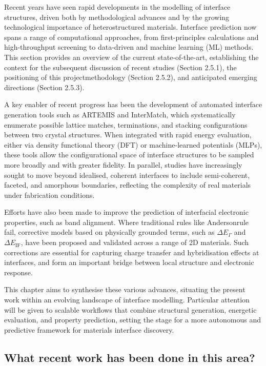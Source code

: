 Recent years have seen rapid developments in the modelling of interface structures, driven both by methodological
advances and by the growing technological importance of heterostructured materials. Interface prediction now spans a
range of computational approaches, from first-principles calculations and high-throughput screening to data-driven and
machine learning (ML) methods. This section provides an overview of the current state-of-the-art, establishing the
context for the subsequent discussion of recent studies (Section 2.5.1), the positioning of this project\rqss methodology
(Section 2.5.2), and anticipated emerging directions (Section 2.5.3).

A key enabler of recent progress has been the development of automated interface generation tools such as ARTEMIS and
InterMatch, which systematically enumerate possible lattice matches, terminations, and stacking configurations between
two crystal structures. When integrated with rapid energy evaluation, either via density functional theory (DFT) or
machine-learned potentials (MLPs), these tools allow the configurational space of interface structures to be sampled
more broadly and with greater fidelity. In parallel, studies have increasingly sought to move beyond idealised,
coherent interfaces to include semi-coherent, faceted, and amorphous boundaries, reflecting the complexity of real
materials under fabrication conditions.

Efforts have also been made to improve the prediction of interfacial electronic properties, such as band alignment.
Where traditional rules like Anderson\rqss rule fail, corrective models based on physically grounded terms, such as
$\Delta E_{\Gamma}$ and $\Delta E_{\mathrm{IF}}$, have been proposed and validated across a range of 2D materials. Such corrections
are essential for capturing charge transfer and hybridisation effects at interfaces, and form an important bridge
between local structure and electronic response.

This chapter aims to synthesise these various advances, situating the present work within an evolving landscape of
interface modelling. Particular attention will be given to scalable workflows that combine structural generation,
energetic evaluation, and property prediction, setting the stage for a more autonomous and predictive framework for
materials interface discovery.

\subsection{What recent work has been done in this area?}

